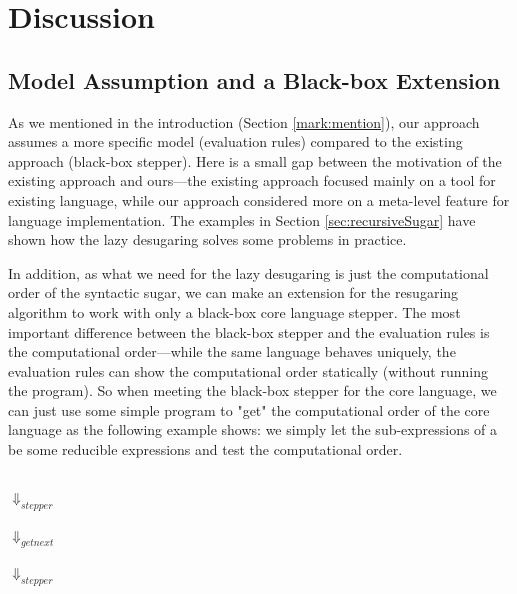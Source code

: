 \section{Discussion}
\label{sec5}

\subsection{Model Assumption and a Black-box Extension}
\label{sec5.1}


As we mentioned in the introduction (Section \ref{mark:mention}), our approach assumes a more specific model (evaluation rules) compared to the existing approach (black-box stepper). Here is a small gap between the motivation of the existing approach and ours---the existing approach focused mainly on a tool for existing language, while our approach considered more on a meta-level feature for language implementation. The examples in Section \ref{sec:recursiveSugar} have shown how the lazy desugaring solves some problems in practice.

In addition, as what we need for the lazy desugaring is just the computational order of the syntactic sugar, we can make an extension for the resugaring algorithm to work with only a black-box core language stepper. The most important difference between the black-box stepper and the evaluation rules is the computational order---while the same language behaves uniquely, the evaluation rules can show the computational order statically (without running the program). So when meeting the black-box stepper for the core language, we can just use some simple program to "get" the computational order of the core language as the following example  shows: we simply let the sub-expressions of a  be some reducible expressions and test the computational order.

\begin{center}\footnotesize
	\\ $\Downarrow_{stepper}$\\ \\ $\Downarrow_{getnext}$\\ \\ $\Downarrow_{stepper}$\\ \qquad{}\\
\end{center}


